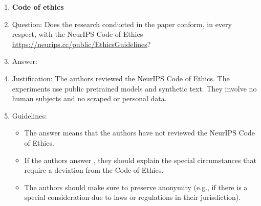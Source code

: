 \begin{enumerate}
\item {\bf Code of ethics}
    \item[] Question: Does the research conducted in the paper conform, in every respect, with the NeurIPS Code of Ethics \url{https://neurips.cc/public/EthicsGuidelines}?
    \item[] Answer: \answerYes{}
    \item[] Justification: The authors reviewed the NeurIPS Code of Ethics. The experiments use public pretrained models and synthetic text. They involve no human subjects and no scraped or personal data.
    \item[] Guidelines:
    \begin{itemize}
        \item The answer \answerNA{} means that the authors have not reviewed the NeurIPS Code of Ethics.
        \item If the authors answer \answerNo, they should explain the special circumstances that require a deviation from the Code of Ethics.
        \item The authors should make sure to preserve anonymity (e.g., if there is a special consideration due to laws or regulations in their jurisdiction).
    \end{itemize}



\end{enumerate}
